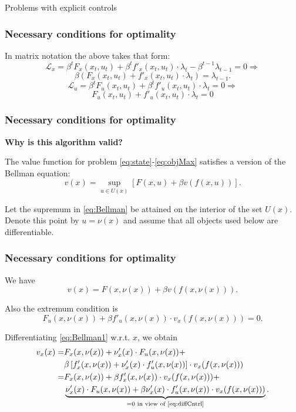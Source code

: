\documentclass[10pt]{beamer}
\theoremstyle{definition}
\begin{document}
\begin{section}{Problems with explicit controls}
\begin{frame}[fragile]
\frametitle{Necessary conditions for optimality}
In matrix notation the above takes that form:
\[ \mathcal{L}_x = \beta^t F_x(x_t,u_t)+\beta^t f'_x(x_t,u_t)\cdot \lambda_t - \beta^{t-1}\lambda_{t-1} = 0 \Rightarrow \]
\begin{equation}
\beta ( F_x(x_t,u_t)+ f'_x(x_t,u_t)\cdot \lambda_t ) = \lambda_{t-1}.
\label{eq:LagrX}
\end{equation}  \bigskip
\[ \mathcal{L}_u = \beta^t F_u (x_t,u_t)+ \beta^t f'_u(x_t,u_t)\cdot \lambda_t = 0 \Rightarrow \]
\begin{equation}
F_u (x_t,u_t)+ f'_u(x_t,u_t)\cdot \lambda_t = 0
\label{eq:LagrU}
\end{equation}
\end{frame}



\begin{frame}[fragile]
\frametitle{Necessary conditions for optimality}
\textbf{Why is this algorithm valid?}\bigskip \bigskip

The value function for problem \eqref{eq:state}-\eqref{eq:objMax} satisfies a version of the Bellman equation:
\begin{equation}
v(x) = \sup_{u \in U(x)}  \left[
F(x,u)+\beta v(f(x,u)) \right]. \label{eq:Bellman}
\end{equation}


Let the supremum in \eqref{eq:Bellman} be attained on the interior of the set $ U(x) $. Denote this point by $ u = \nu(x) $ and assume that all objects used below are differentiable.
\end{frame}



\begin{frame}[fragile]
\frametitle{Necessary conditions for optimality}
We have \begin{equation}
 v(x) = F(x,\nu(x)) + \beta v(f(x,\nu(x))) .
\label{eq:Bellman1}
\end{equation}

Also the extremum condition is \begin{equation}
F_u(x,\nu(x)) + \beta f'_u(x,\nu(x)) \cdot v_x(f(x,\nu(x))) = 0.
\label{eq:diffCntrl}
\end{equation} 

Differentiating \eqref{eq:Bellman1} w.r.t. $ x $, we obtain
\begin{equation*}
\begin{split}
 v_x(x) = & F_x(x,\nu(x)) +  \nu'_x(x) \cdot F_u(x,\nu(x)) + \\
 & \beta \left[ f'_x(x,\nu(x)) + \nu'_x(x) \cdot f'_u(x,\nu(x))  \right]\cdot v_x(f(x,\nu(x)))\\
 = & F_x(x,\nu(x)) + \beta  f'_x(x,\nu(x))\cdot v_x(f(x,\nu(x))) + \\
 &  \underbrace{\nu'_x(x) \cdot F_u(x,\nu(x)) + \beta \nu'_x(x) \cdot f'_u(x,\nu(x)) \cdot v_x(f(x,\nu(x)))}_{=0 \text{ in view of \eqref{eq:diffCntrl}}}.
\end{split}
\end{equation*}
\end{frame}



\end{section}
\end{document}
